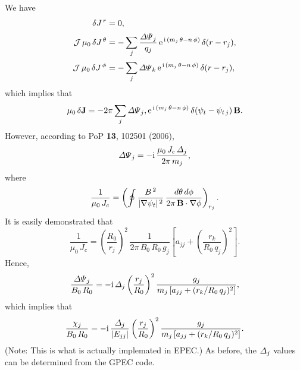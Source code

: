 \documentclass[12pt]{article}
\begin{document}
We have
\begin{align}
\delta J^{\,r} &= 0,\\[0.5ex]
{\cal J}\,\mu_0\,\delta J^{\,\theta} &= -\sum_j \frac{{\mit\Delta\Psi}_j}{q_j}\,{\rm e}^{\,{\rm i}\,(m_j\,\theta-n\,\phi)}\,\delta(r-r_j),\\[0.5ex]
{\cal J}\,\mu_0\,\delta J^{\,\phi} &= -\sum_j {\mit\Delta\Psi}_k\,{\rm e}^{\,{\rm i}\,(m_j\,\theta-n\,\phi)}\,\delta(r-r_j),
\end{align}
which implies that
\begin{equation}
\mu_0\,\delta{\bf J} = -2\pi\sum_j{\mit\Delta\Psi}_j,{\rm e}^{\,{\rm i}\,(m_j\,\theta-n\,\phi)}\,\delta(\psi_t-\psi_{t\,j})\,{\bf B}.
\end{equation}
However, according to PoP {\bf 13}, 102501 (2006),
\begin{equation}
{\mit\Delta\Psi}_j =- {\rm i}\,\frac{\mu_0\,J_c\,{\mit\Delta}_j}{2\pi\,m_j},
\end{equation}
where
\begin{equation}
\frac{1}{\mu_0\,J_c} = \left(\oint \frac{B^{\,2}}{|\nabla\psi_t|^{\,2}}\,\frac{d\theta\,d\phi}{2\pi\,{\bf B}\cdot\nabla\phi}\right)_{r_j}.
\end{equation}
It is easily demonstrated that
\begin{equation}
\frac{1}{\mu_0\,J_c} = \left(\frac{R_0}{r_j}\right)^2\,\frac{1}{2\pi\,B_0\,R_0\,g_j}\left[a_{jj} + \left(\frac{r_k}{R_0\,q_j}\right)^2\right].
\end{equation}
Hence,
\begin{equation}
\frac{{\mit\Delta\Psi}_j}{B_0\,R_0} = -{\rm i}\,{\mit\Delta}_j\left(\frac{r_j}{R_0}\right)^2\frac{g_j}{m_j\,[a_{jj}+ (r_k/R_0\,q_j)^2]},
\end{equation}
which implies that
\begin{equation}
\frac{\chi_j}{B_0\,R_0} = -{\rm i}\,\frac{{\mit\Delta}_j}{|E_{jj}|}\left(\frac{r_j}{R_0}\right)^2\frac{g_j}{m_j\,[a_{jj}+ (r_k/R_0\,q_j)^2]}.
\end{equation}
(Note: This is what is actually implemated in EPEC.)
As before, the ${\mit\Delta}_j$ values can be determined from the GPEC code. 
\end{document}
